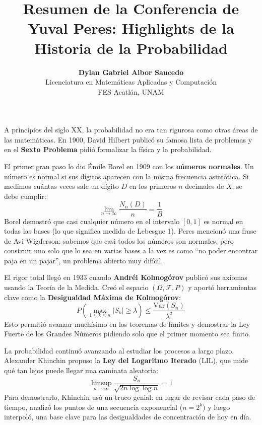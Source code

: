 \documentclass[11pt,letterpaper]{article}
\title{\textbf{Resumen de la Conferencia de Yuval Peres: Highlights de la Historia de la Probabilidad}}
\author{\textbf{Dylan Gabriel Albor Saucedo} \\ \small Licenciatura en Matemáticas Aplicadas y Computación \\ \small FES Acatlán, UNAM}
\date{}
\begin{document}
\maketitle


A principios del siglo XX, la probabilidad no era tan rigurosa como otras áreas de las matemáticas. En 1900, David Hilbert publicó su famosa lista de problemas y en el \textbf{Sexto Problema} pidió formalizar la física y la probabilidad.

El primer gran paso lo dio Émile Borel en 1909 con los \textbf{números normales}. Un número es normal si sus dígitos aparecen con la misma frecuencia asintótica. Si medimos cuántas veces sale un dígito $D$ en los primeros $n$ decimales de $X$, se debe cumplir:
\begin{equation}
\lim_{n \to \infty} \frac{N_n(D)}{n} = \frac{1}{B}
\end{equation}
Borel demostró que casi cualquier número en el intervalo $[0,1]$ es normal en todas las bases (lo que significa medida de Lebesgue 1). Peres mencionó una frase de Avi Wigderson: sabemos que casi todos los números son normales, pero construir uno solo que lo sea en varias bases a la vez es como ``no poder encontrar paja en un pajar'', un problema abierto muy difícil.

El rigor total llegó en 1933 cuando \textbf{Andréi Kolmogórov} publicó sus axiomas usando la Teoría de la Medida. Creó el espacio $(\Omega, \mathcal{F}, P)$ y aportó herramientas clave como la \textbf{Desigualdad Máxima de Kolmogórov}:
\begin{equation}
P\left( \max_{1 \le k \le n} |S_k| \ge \lambda \right) \le \frac{\text{Var}(S_n)}{\lambda^2}
\end{equation}
Esto permitió avanzar muchísimo en los teoremas de límites y demostrar la Ley Fuerte de los Grandes Números pidiendo solo que el primer momento sea finito.


La probabilidad continuó avanzando al estudiar los procesos a largo plazo. Alexander Khinchin propuso la \textbf{Ley del Logaritmo Iterado} (LIL), que mide qué tan lejos puede llegar una caminata aleatoria:
\begin{equation}
\limsup_{n \to \infty} \frac{S_n}{\sqrt{2n \log \log n}} = 1
\end{equation}
Para demostrarlo, Khinchin usó un truco genial: en lugar de revisar cada paso de tiempo, analizó los puntos de una secuencia exponencial ($n = 2^k$) y luego interpoló, una base clave para las desigualdades de concentración de hoy en día.
\end{document}
